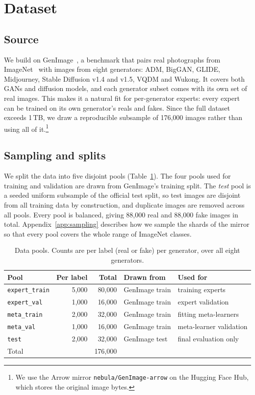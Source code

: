 \documentclass[10pt,a4paper]{article}
\begin{document}
\section{Dataset}\label{sec:dataset}

\subsection{Source}

We build on GenImage~\cite{zhu2023genimage}, a benchmark that pairs real photographs from ImageNet~\cite{deng2009imagenet} with images from eight generators: ADM, BigGAN, GLIDE, Midjourney, Stable Diffusion v1.4 and v1.5, VQDM and Wukong. It covers both GANs and diffusion models, and each generator subset comes with its own set of real images. This makes it a natural fit for per-generator experts: every expert can be trained on its own generator's reals and fakes. Since the full dataset exceeds 1\,TB, we draw a reproducible subsample of 176,000 images rather than using all of it.\footnote{We use the Arrow mirror \texttt{nebula/GenImage-arrow} on the Hugging Face Hub, which stores the original image bytes.}

\subsection{Sampling and splits}

We split the data into five disjoint pools (Table~\ref{tab:pools}). The four pools used for training and validation are drawn from GenImage's training split. The \emph{test} pool is a seeded uniform subsample of the official test split, so test images are disjoint from all training data by construction, and duplicate images are removed across all pools. Every pool is balanced, giving 88,000 real and 88,000 fake images in total. Appendix~\ref{app:sampling} describes how we sample the shards of the mirror so that every pool covers the whole range of ImageNet classes.

\begin{table}[t]
\centering
\small
\begin{tabular}{lrrll}
\toprule
Pool & Per label & Total & Drawn from & Used for \\
\midrule
\texttt{expert\_train} & 5,000 & 80,000 & GenImage train & training experts \\
\texttt{expert\_val} & 1,000 & 16,000 & GenImage train & expert validation \\
\texttt{meta\_train} & 2,000 & 32,000 & GenImage train & fitting meta-learners \\
\texttt{meta\_val} & 1,000 & 16,000 & GenImage train & meta-learner validation \\
\texttt{test} & 2,000 & 32,000 & GenImage test & final evaluation only \\
\midrule
Total & & 176,000 & & \\
\bottomrule
\end{tabular}
\caption{Data pools. Counts are per label (real or fake) per generator, over all eight generators.}
\label{tab:pools}
\end{table}
\end{document}
